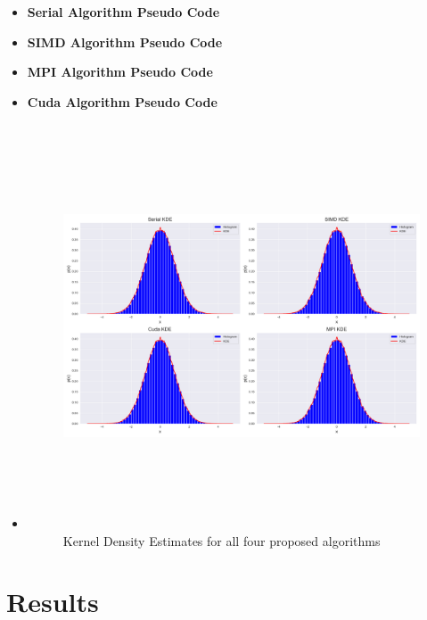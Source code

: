 \documentclass[review]{elsarticle}
\begin{document}
\begin{itemize}
    \item \textbf{Serial Algorithm Pseudo Code}
    \item \textbf{SIMD Algorithm Pseudo Code}
    \item \textbf{MPI Algorithm Pseudo Code}
    \item \textbf{Cuda Algorithm Pseudo Code} \newline
    \item 
    \begin{figure}
      \centering
      \includegraphics[width=15cm,height=12cm]{figures/multiple_kde.png}
      \caption{Kernel Density Estimates for all four proposed algorithms}
      \label{fig:multiple_kde}
    \end{figure}
\end{itemize}


\section{Results}
\end{document}
